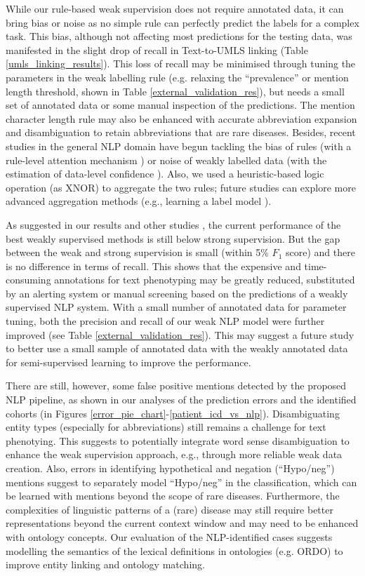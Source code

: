 \documentclass[twocolumn]{bmcart}
\begin{document}
While our rule-based weak supervision does not require annotated data, it can bring bias or noise as no simple rule can perfectly predict the labels for a complex task. This bias, although not affecting most predictions for the testing data, was manifested in the slight drop of recall in Text-to-UMLS linking (Table \ref{umls_linking_results}). This loss of recall may be minimised through tuning the parameters in the weak labelling rule (e.g. relaxing the ``prevalence'' or mention length threshold, shown in Table \ref{external_validation_res}), but needs a small set of annotated data or some manual inspection of the predictions. The mention character length rule may also be enhanced with accurate abbreviation expansion and disambiguation to retain abbreviations that are rare diseases. Besides, recent studies in the general NLP domain have begun tackling the bias of rules (with a rule-level attention mechanism \cite{karamanolakis2021}) or noise of weakly labelled data (with the estimation of data-level confidence \cite{jiang2021}). Also, we used a heuristic-based logic operation (as XNOR) to aggregate the two rules; future studies can explore more advanced aggregation methods (e.g., learning a label model \cite{fries2021ontology,ratner2020snorkel}).

As suggested in our results and other studies \cite{fries2021ontology,ratner2020snorkel}, the current performance of the best weakly supervised methods is still below strong supervision. But the gap between the weak and strong supervision is small (within 5\% $F_1$ score) and there is no difference in terms of recall. This shows that the expensive and time-consuming annotations for text phenotyping may be greatly reduced, substituted by an alerting system or manual screening based on the predictions of a weakly supervised NLP system. With a small number of annotated data for parameter tuning, both the precision and recall of our weak NLP model were further improved (see Table \ref{external_validation_res}). This may suggest a future study to better use a small sample of annotated data with the weakly annotated data for semi-supervised learning to improve the performance.

There are still, however, some false positive mentions detected by the proposed NLP pipeline, as shown in our analyses of the prediction errors and the identified cohorts (in Figures \ref{error_pie_chart}-\ref{patient_icd_vs_nlp}). Disambiguating entity types (especially for abbreviations) still remains a challenge for text phenotying. This suggests to potentially integrate word sense disambiguation to enhance the weak supervision approach, e.g., through more reliable weak data creation. Also, errors in identifying hypothetical and negation (``Hypo/neg'') mentions suggest to separately model ``Hypo/neg'' in the classification, which can be learned with mentions beyond the scope of rare diseases. Furthermore, the complexities of linguistic patterns of a (rare) disease may still require better representations beyond the current context window and may need to be enhanced with ontology concepts. Our evaluation of the NLP-identified cases suggests modelling the semantics of the lexical definitions in ontologies (e.g. ORDO) to improve entity linking and ontology matching.
\end{document}

